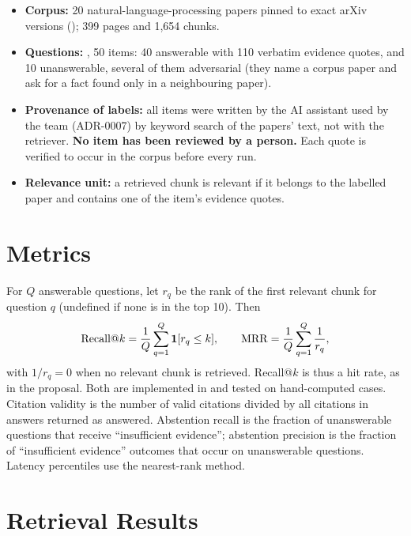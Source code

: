 \begin{itemize}
  \item \textbf{Corpus:} 20 natural-language-processing papers pinned to exact arXiv versions
        (); 399 pages and 1{,}654 chunks.
  \item \textbf{Questions:} , 50 items: 40 answerable with 110 verbatim evidence quotes, and 10
        unanswerable, several of them adversarial (they name a corpus paper and ask for a fact found only in a
        neighbouring paper).
  \item \textbf{Provenance of labels:} all items were written by the AI assistant used by the team (ADR-0007) by
        keyword search of the papers' text, not with the retriever. \textbf{No item has been reviewed by a person.}
        Each quote is verified to occur in the corpus before every run.
  \item \textbf{Relevance unit:} a retrieved chunk is relevant if it belongs to the labelled paper and contains one
        of the item's evidence quotes.
\end{itemize}

\section{Metrics}

For $Q$ answerable questions, let $r_q$ be the rank of the first relevant chunk for question $q$ (undefined if none
is in the top 10). Then
\begin{equation}
  \mathrm{Recall@}k = \frac{1}{Q}\sum_{q=1}^{Q} \mathbf{1}[r_q \leq k], \qquad
  \mathrm{MRR} = \frac{1}{Q}\sum_{q=1}^{Q} \frac{1}{r_q},
\end{equation}
with $1/r_q = 0$ when no relevant chunk is retrieved. Recall@$k$ is thus a hit rate, as in the proposal. Both are
implemented in  and tested on hand-computed cases. Citation validity is the
number of valid citations divided by all citations in answers returned as answered. Abstention recall is the
fraction of unanswerable questions that receive ``insufficient evidence''; abstention precision is the fraction of
``insufficient evidence'' outcomes that occur on unanswerable questions. Latency percentiles use the nearest-rank
method.

\section{Retrieval Results}


